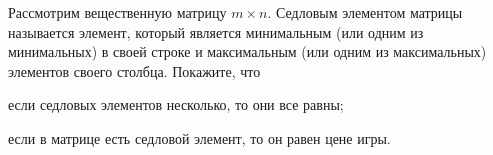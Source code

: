 Рассмотрим вещественную матрицу $m \times n$. Седловым элементом матрицы называется элемент, который является минимальным
(или одним из минимальных) в своей строке и максимальным (или одним из максимальных) элементов своего столбца. Покажите, что
\begin{enumcyr}
    \item если седловых элементов несколько, то они все равны;
    \item если в матрице есть седловой элемент, то он равен цене игры.
\end{enumcyr}